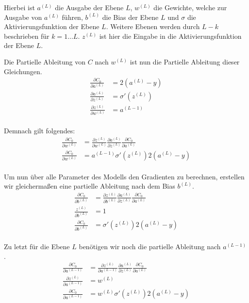 Hierbei ist $a^{(L)}$ die Ausgabe der Ebene $L$, $w^{(L)}$ die Gewichte, welche zur Ausgabe von $a^{(L)}$ führen, $b^{(L)}$ die Bias der Ebene $L$ und $\sigma$ die Aktivierungsfunktion der Ebene $L$.
Weitere Ebenen werden durch $L-k$ beschrieben für $k=1\hdots L$. $z^{(L)}$ ist hier die Eingabe in die Aktivierungsfunktion der Ebene $L$.

Die Partielle Ableitung von $C$ nach $w^{(L)}$ ist nun die Partielle Ableitung dieser Gleichungen.
\begin{align}
    \frac{\partial C_0}{\partial a^{(L)}} &= 2(a^{(L)} - y)\\
    \frac{\partial a^{(L)}}{\partial z^{(L)}} &= \sigma'(z^{(L)})\\
    \frac{\partial z^{(L)}}{\partial w^{(L)}} &= a^{(L-1)}\\
\end{align}

Demnach gilt folgendes:
\begin{align}
    \frac{\partial C_0}{\partial w^{(L)}} &= \frac{\partial z^{(L)}}{\partial w^{(L)}}\frac{\partial a^{(L)}}{\partial z^{(L)}}\frac{\partial C_0}{\partial a^{(L)}}\\
    \frac{\partial C_0}{\partial w^{(L)}} &= a^{(L-1)}\sigma'(z^{(L)})2(a^{(L)} - y)\\
\end{align}


Um nun über alle Parameter des Modells den Gradienten zu berechnen, erstellen wir gleichermaßen eine partielle Ableitung nach dem Bias $b^{(L)}$.
\begin{align}
    \frac{\partial C_0}{\partial b^{(L)}} &= \frac{\partial z^{(L)}}{\partial b^{(L)}}\frac{\partial a^{(L)}}{\partial z^{(L)}}\frac{\partial C_0}{\partial a^{(L)}}\\
    \frac{z^{(L)}}{\partial b^{(L)}} &= 1\\
    \frac{\partial C_0}{\partial b^{(L)}} &= \sigma'(z^{(L)})2(a^{(L)} - y)\\
\end{align}

Zu letzt für die Ebene $L$ benötigen wir noch die partielle Ableitung nach $a^{(L-1)}$.
\begin{align}
    \frac{\partial C_0}{\partial a^{(L-1)}} &= \frac{\partial z^{(L)}}{\partial a^{(L-1)}}\frac{\partial a^{(L)}}{\partial z^{(L)}}\frac{\partial C_0}{\partial a^{(L)}}\\
    \frac{\partial z^{(L)}}{\partial a^{(L-1)}} &= w^{(L)}\\
    \frac{\partial C_0}{\partial a^{(L-1)}} &= w^{(L)}\sigma'(z^{(L)})2(a^{(L)} - y)\\
\end{align}

